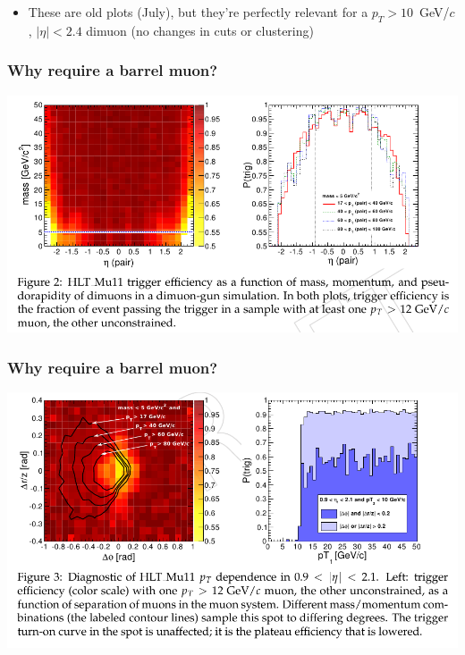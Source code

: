 \documentclass[compress]{beamer}
\begin{document}
\begin{frame}
\begin{itemize}
\item These are old plots (July), but they're perfectly relevant for a
  $p_T > 10$~GeV/$c$, $|\eta| < 2.4$ dimuon (no changes in cuts or clustering)
\end{itemize}
\end{frame}

\begin{frame}
\frametitle{Why require a barrel muon?}

\includegraphics[width=\linewidth]{trigger_efficiency_loss1.png}
\end{frame}

\begin{frame}
\frametitle{Why require a barrel muon?}

\includegraphics[width=\linewidth]{trigger_efficiency_loss2.png}
\end{frame}
\end{document}
